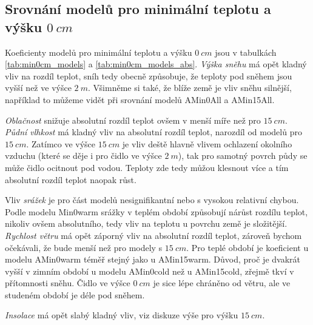 \subsection{Srovnání modelů pro minimální teplotu a výšku $\SI{0}{cm}$}
Koeficienty modelů pro minimální teplotu a výšku $\SI{0}{cm}$ jsou v tabulkách \ref{tab:min0cm_models} a \ref{tab:min0cm_models_abs}. \textit{Výška sněhu} má opět kladný vliv na rozdíl teplot, sníh tedy obecně způsobuje, že teploty pod sněhem jsou vyšší než ve výšce $\SI{2}{m}$. Všimněme si také, že blíže země je vliv sněhu silnější, například to můžeme vidět při srovnání modelů AMin0All a AMin15All.

\textit{Oblačnost} snižuje absolutní rozdíl teplot ovšem v menší míře než pro $\SI{15}{cm}$. \textit{Půdní vlhkost} má kladný vliv na absolutní rozdíl teplot, narozdíl od modelů pro $\SI{15}{cm}$. Zatímco ve výšce $\SI{15}{cm}$ je vliv deště hlavně vlivem ochlazení okolního vzduchu (které se děje i pro čidlo ve výšce $\SI{2}{m}$), tak pro samotný povrch půdy se může čidlo ocitnout pod vodou. Teploty zde tedy můžou klesnout více a tím absolutní rozdíl teplot naopak růst.

Vliv \textit{srážek} je pro část modelů nesignifikantní nebo s vysokou relativní chybou. Podle modelu Min0warm srážky v teplém období způsobují nárůst rozdílu teplot, nikoliv ovšem absolutního, tedy vliv na teplotu u povrchu země je složitější. \textit{Rychlost větru} má opět záporný vliv na absolutní rozdíl teplot, zároveň bychom očekávali, že bude menší než pro modely s $\SI{15}{cm}$. Pro teplé období je koeficient u modelu AMin0warm téměř stejný jako u AMin15warm. Důvod, proč je dvakrát vyšší v zimním období u modelu AMin0cold než u AMin15cold, zřejmě tkví v přítomnosti sněhu. Čidlo ve výšce $\SI{0}{cm}$ je sice lépe chráněno od větru, ale ve studeném období je déle pod sněhem. 

\textit{Insolace} má opět slabý kladný vliv, viz diskuze výše pro výšku $\SI{15}{cm}$.

